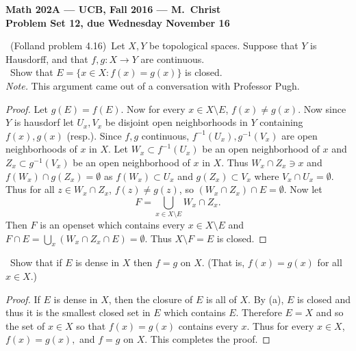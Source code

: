 \documentclass[11pt]{amsart}
\theoremstyle{definition}
\numberwithin{theorem}{section}
\numberwithin{definition}{section}
\numberwithin{equation}{section}
\begin{document}
\begin{center}{\bf Math 202A --- UCB, Fall 2016 --- M.~Christ}
\\
{\bf Problem Set 12, due Wednesday November 16}
\end{center}

\medskip {}\ (Folland problem 4.16)\ 
Let $X,Y$ be topological spaces. Suppose that $Y$ is Hausdorff,
and that $f,g:X\to Y$ are continuous. \\
\ 
Show that $E=\{x\in X: f(x)=g(x)\}$ is closed. \\[0.5cm]
\emph{Note.} This argument came out of a conversation with Professor Pugh.
\begin{proof}
	Let $g(E) = f(E)$. Now for every $x \in X \setminus E$, $f(x) \neq g(x).$ Now since $Y$ is hausdorf let $U_x,V_x$ be disjoint open neighborhoods in $Y$ containing $f(x),g(x)$ (resp.). Since $f,g$ continuous, $f^{-1}(U_x), g^{-1}(V_x)$ are open neighborhoods of $x$ in $X$. Let $W_x \subset f^{-1}(U_x)$ be an open neighborhood of $x$ and $Z_x \subset g^{-1}(V_x)$ be an open neighborhood of $x$ in $X$. Thus $W_x \cap Z_x \ni x$ and $f(W_x) \cap g(Z_x) = \emptyset$ as $f(W_x) \subset U_x$ and $g(Z_x) \subset V_x$ where $V_x \cap U_x = \emptyset.$ Thus for all $z \in W_x \cap Z_x$, $f(z) \neq g(z)$, so $(W_x \cap Z_x) \cap E = \emptyset.$ Now let
	\begin{equation*}
		F = \bigcup_{x \in X \setminus E} W_x \cap Z_x.
	\end{equation*}
	Then $F$ is an openset which contains every $x \in X \setminus E$ and $F \cap E = \bigcup_x (W_x \cap Z_x \cap E) = \emptyset$. Thus $X \setminus F = E$ is closed.
\end{proof}
\noindent {\bf (b)}\ 
Show that if $E$ is dense in $X$ then $f=g$ on $X$.
(That is, $f(x)=g(x)$ for all $x\in X$.) 
\begin{proof}
	If $E$ is dense in $X$, then the closure of $E$ is all of $X$. By (a), $E$ is closed
	and thus it is the smallest closed set in $E$ which contains $E$. Therefore $E = X$
	and so the set of $x \in X$ so that $f(x) = g(x)$ contains every $x$. Thus for every $x\in X$,
	$f(x) = g(x),$ and $f =g$ on $X.$ This completes the proof.
\end{proof}
\end{document}
